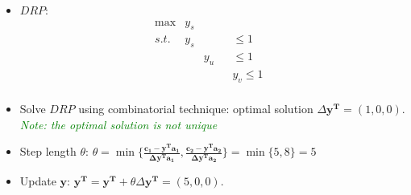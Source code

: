 \documentclass[mathserif]{beamer}
\begin{document}
{\begin{small}
\begin{itemize}
\[\begin{array}{rrrrrrrrrrrrrrrrrl}
\end{array} \nonumber
\]
%   
\item $DRP$:   
\[
\begin{array}{rrrrrrrrrl}
 \max & y_s &      & &            &\\
s.t. & y_s  &      & &     \leq 1 &  \\
     &      & y_u  & &     \leq 1 &  \\
     &      &      & & y_v \leq 1 &  \\  
\end{array} \nonumber
\]

  


\item  Solve $DRP$  using combinatorial technique: optimal solution  $\Delta \mathbf{y^T} = (1, 0, 0)$. \textcolor{green}{{\it Note: the optimal solution  is not unique}}

\item Step length $\theta$: $\theta = \min \{ \frac{ \mathbf{c_1 - y^Ta_1} }{ \mathbf{\Delta y^T a_1}  }, \frac{ \mathbf{c_2 - y^Ta_2} }{ \mathbf{\Delta y^T a_2}  }  \} = \min\{ 5, 8\} = 5$

\item Update $\mathbf{y}$: $\mathbf{y^T=y^T}+\theta \Delta \mathbf{y^T}  = (5, 0, 0)$. 



\end{itemize}
\end{small}}
\end{document}
